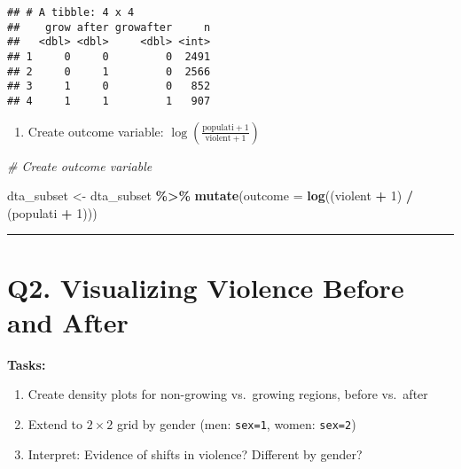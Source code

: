 \documentclass[
]{article}
\newenvironment{Shaded}{\begin{snugshade}}{\end{snugshade}}
\newcommand{\AttributeTok}[1]{\textcolor[rgb]{0.13,0.29,0.53}{#1}}
\newcommand{\CommentTok}[1]{\textcolor[rgb]{0.56,0.35,0.01}{\textit{#1}}}
\newcommand{\DecValTok}[1]{\textcolor[rgb]{0.00,0.00,0.81}{#1}}
\newcommand{\FunctionTok}[1]{\textcolor[rgb]{0.13,0.29,0.53}{\textbf{#1}}}
\newcommand{\NormalTok}[1]{#1}
\newcommand{\OtherTok}[1]{\textcolor[rgb]{0.56,0.35,0.01}{#1}}
\newcommand{\SpecialCharTok}[1]{\textcolor[rgb]{0.81,0.36,0.00}{\textbf{#1}}}
\providecommand{\tightlist}{%
  \setlength{\itemsep}{0pt}\setlength{\parskip}{0pt}}
\begin{document}
\begin{verbatim}
## # A tibble: 4 x 4
##    grow after growafter     n
##   <dbl> <dbl>     <dbl> <int>
## 1     0     0         0  2491
## 2     0     1         0  2566
## 3     1     0         0   852
## 4     1     1         1   907
\end{verbatim}

\begin{enumerate}
\def\labelenumi{\arabic{enumi}.}
\setcounter{enumi}{4}
\tightlist
\item
  Create outcome variable:
  \(\log\left(\frac{\text{populati}+1}{\text{violent}+1}\right)\)
\end{enumerate}

\begin{Shaded}
\begin{Highlighting}[]
\CommentTok{\# Create outcome variable}

\NormalTok{dta\_subset }\OtherTok{\textless{}{-}}\NormalTok{ dta\_subset }\SpecialCharTok{\%\textgreater{}\%} 
  \FunctionTok{mutate}\NormalTok{(}\AttributeTok{outcome =} \FunctionTok{log}\NormalTok{((violent }\SpecialCharTok{+} \DecValTok{1}\NormalTok{) }\SpecialCharTok{/}\NormalTok{ (populati }\SpecialCharTok{+} \DecValTok{1}\NormalTok{)))}
\end{Highlighting}
\end{Shaded}

\begin{center}\rule{0.5\linewidth}{0.5pt}\end{center}

\section{Q2. Visualizing Violence Before and
After}\label{q2.-visualizing-violence-before-and-after}

\textbf{Tasks:}

\begin{enumerate}
\def\labelenumi{\arabic{enumi}.}
\tightlist
\item
  Create density plots for non-growing vs.~growing regions, before
  vs.~after
\item
  Extend to \(2 \times 2\) grid by gender (men: \texttt{sex=1}, women:
  \texttt{sex=2})
\item
  Interpret: Evidence of shifts in violence? Different by gender?
\end{enumerate}
\end{document}
